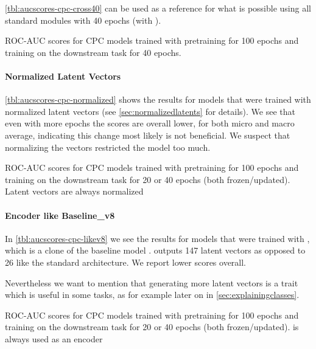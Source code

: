 \autoref{tbl:aucscores-cpc-cross40} can be used as a reference for what is possible using all standard modules with 40 epochs (with ).
\begin{table}\centering
	\resizebox{\textwidth}{!}{
		
	}
	\caption*{\small ROC-AUC scores for CPC models trained with pretraining for 100 epochs and training on the downstream task for 40 epochs.}
	\label{tbl:aucscores-cpc-cross40}
\end{table}

\paragraph{Normalized Latent Vectors}
\autoref{tbl:aucscores-cpc-normalized} shows the results for models that were trained with normalized latent vectors (see \autoref{sec:normalizedlatents} for details). We see that even with more epochs the scores are overall lower, for both micro and macro average, indicating this change most likely is not beneficial. We suspect that normalizing the vectors restricted the model too much.
\begin{table}\centering
	\resizebox{\textwidth}{!}{
		
	}
	\caption*{\small ROC-AUC scores for CPC models trained with pretraining for 100 epochs and training on the downstream task for 20 or 40 epochs (both frozen/updated). Latent vectors are always normalized}
	\label{tbl:aucscores-cpc-normalized}
\end{table}

\paragraph{Encoder like Baseline\_v8}
In \autoref{tbl:aucscores-cpc-likev8} we see the results for models that were trained with , which is a clone of the baseline model .  outputs 147 latent vectors as opposed to 26 like the standard architecture. We report lower scores overall.

Nevertheless we want to mention that generating more latent vectors is a trait which is useful in some tasks, as for example later on in \autoref{sec:explainingclasses}.
\begin{table}\centering
	\resizebox{\textwidth}{!}{
		
	}
	\caption*{\small ROC-AUC scores for CPC models trained with pretraining for 100 epochs and training on the downstream task for 20 or 40 epochs (both frozen/updated).  is always used as an encoder}
	\label{tbl:aucscores-cpc-likev8}
\end{table}

